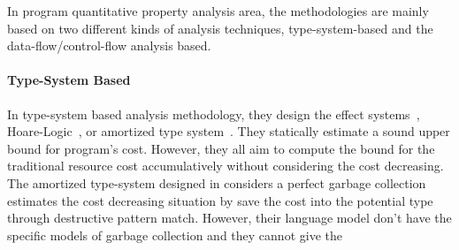 {
    In program quantitative property analysis area, the methodologies are mainly based on
    two different kinds of analysis techniques, type-system-based and the  data-flow/control-flow analysis based.
\paragraph*{Type-System Based}
In type-system based analysis methodology,
they design the effect systems~\cite{cciccek2017relational,radivcek2017monadic,qu2019relational},
Hoare-Logic~\cite{gaboardi2021graded}, or amortized type system~\cite{hoffmann_jost_2022}.
They statically estimate a sound upper bound for program's cost.
However, they all aim to compute the bound for the traditional resource cost accumulatively
without considering the cost decreasing. 
The amortized type-system designed in \cite{hoffmann_jost_2022} considers a perfect garbage collection
estimates the cost decreasing situation by save the cost into the potential type through destructive pattern match.
However, their language model don't have the specific models of garbage collection and they cannot give the 
}
